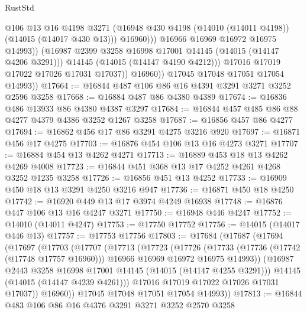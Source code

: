 \begin{lexlean}{RustStd}
\begin{coremodule}
                            @106
                            @13
                            @16
                            @4198
                            @3271
                            (@16948 @430 @4198 (@14010 (@14011 @4198)) (@14015 (@14017 @430 @13)))
                            @16960)))
                      @16966
                      @16969
                      @16972
                      @16975
                      @14993))
                  (@16987 @2399 @3258 @16998 @17001 @14145 (@14015 (@14147 @4206 @3291)))
                  @14145
                  (@14015 (@14147 @4190 @4212)))
                @17016
                @17019
                @17022
                @17026
                @17031
                @17037))
            @16960))
        @17045
        @17048
        @17051
        @17054
        @14993))
@17664 := @16844 @487 @106 @86 @16 @4391 @3291 @3271 @3252 @2596 @3258
@17668 := @16884 @487 @86 @4380 @4389
@17674 := @16836 @486 @13933 @86 @4380 @4387 @3297
@17684 := @16844 @457 @485 @86 @88 @4277 @4379 @4386 @3252 @1267 @3258
@17687 := @16856 @457 @86 @4277
@17694 := @16862 @456 @17 @86 @3291 @4275 @3216 @920
@17697 := @16871 @456 @17 @4275
@17703 := @16876 @454 @106 @13 @16 @4273 @3271
@17707 := @16884 @454 @13 @4262 @4271
@17713 := @16889 @453 @18 @13 @4262 @4269 @4008
@17723 := @16844 @451 @368 @13 @17 @4252 @4261 @4268 @3252 @1235 @3258
@17726 := @16856 @451 @13 @4252
@17733 := @16909 @450 @18 @13 @3291 @4250 @3216 @947
@17736 := @16871 @450 @18 @4250
@17742 := @16920 @449 @13 @17 @3974 @4249 @16938
@17748 := @16876 @447 @106 @13 @16 @4247 @3271
@17750 := @16948 @446 @4247
@17752 := @14010 (@14011 @4247)
@17753 := @17750 @17752
@17756 := @14015 (@14017 @446 @13)
@17757 := @17753 @17756
@17803 := @17684
    (@17687
      (@17694
        (@17697
          (@17703
            (@17707
              (@17713
                (@17723
                  (@17726
                    (@17733
                      (@17736 (@17742 (@17748 @17757 @16960)))
                      @16966
                      @16969
                      @16972
                      @16975
                      @14993))
                  (@16987 @2443 @3258 @16998 @17001 @14145 (@14015 (@14147 @4255 @3291)))
                  @14145
                  (@14015 (@14147 @4239 @4261)))
                @17016
                @17019
                @17022
                @17026
                @17031
                @17037))
            @16960))
        @17045
        @17048
        @17051
        @17054
        @14993))
@17813 := @16844 @483 @106 @86 @16 @4376 @3291 @3271 @3252 @2570 @3258

\end{coremodule}
\end{lexlean}
